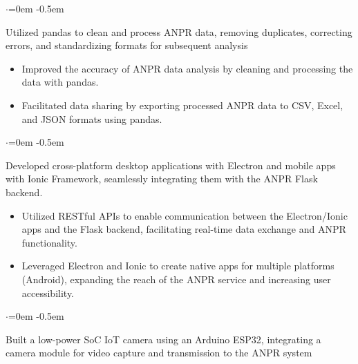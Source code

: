 \documentclass{article}
\begin{document}
\begin{list}{$\cdot$}{\leftmargin=0em} %
    \itemsep -0.5em \vspace{-0.5em} %
    \item Utilized pandas to clean and process ANPR data,  removing duplicates, correcting errors, and standardizing formats for subsequent analysis
\end{list}
\vspace{-1.6em}
\begin{itemize}
    \item Improved the accuracy of ANPR data analysis by  cleaning and processing the data with pandas. 
    \item Facilitated data sharing  by exporting processed ANPR data to CSV, Excel, and JSON formats using pandas.
\end{itemize}



\begin{list}{$\cdot$}{\leftmargin=0em} %
    \itemsep -0.5em \vspace{-0.5em} %
    \item  Developed cross-platform desktop applications with Electron and mobile apps with Ionic Framework, seamlessly
    integrating them with the ANPR Flask backend.
\end{list}

\vspace{-1.6em}
\begin{itemize}
    \item Utilized RESTful APIs to enable communication between the Electron/Ionic apps and the Flask backend, facilitating real-time data exchange and ANPR functionality.
    \item Leveraged Electron and Ionic to create native apps for multiple platforms (Android), expanding the reach of the ANPR service and increasing user accessibility.
\end{itemize}






\begin{list}{$\cdot$}{\leftmargin=0em} %
    \itemsep -0.5em \vspace{-0.5em} %
    \item Built a low-power SoC IoT camera using an Arduino ESP32, integrating a camera module for video
    capture and transmission to the ANPR system
\end{list}
\end{document}
